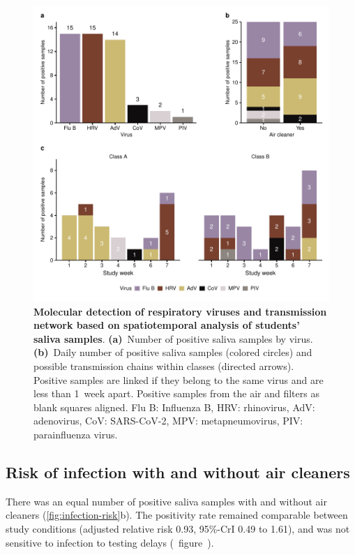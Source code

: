 \documentclass[fleqn,11pt]{wlscirep}
\begin{document}
\begin{figure}[!htpb]
    \centering
    \includegraphics{../../results/mol-data/descriptives.pdf}
    \caption{\textbf{Molecular detection of respiratory viruses and transmission network based on spatiotemporal analysis of students' saliva samples}. \textbf{(a)}~Number of positive saliva samples by virus. \textbf{(b)}~Daily number of positive saliva samples (colored circles) and possible transmission chains within classes (directed arrows). Positive samples are linked if they belong to the same virus and are less than 1~week apart. Positive samples from the air and filters as blank squares aligned. Flu B: Influenza B, HRV: rhinovirus, AdV: adenovirus, CoV: SARS-CoV-2, MPV: metapneumovirus, PIV: parainfluenza virus.}
    \label{fig:molecular-descriptives}
\end{figure}

\subsection{Risk of infection with and without air cleaners}

There was an equal number of positive saliva samples with and without air cleaners (\cref{fig:infection-risk}b). The positivity rate remained comparable between study conditions (adjusted relative risk 0.93, 95\%-CrI 0.49 to 1.61), and was not sensitive to infection to testing delays (\supp~figure~).
\end{document}
